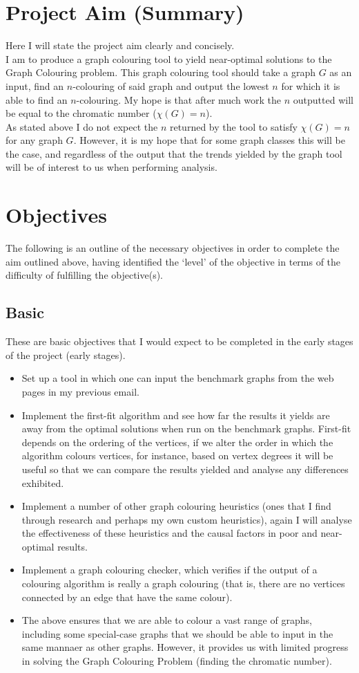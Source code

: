 \documentclass[12pt, a4paper]{article}
\begin{document}
\section*{Project Aim (Summary)}
Here I will state the project aim clearly and concisely.\\
I am to produce a graph colouring tool to yield near-optimal solutions to the Graph Colouring problem. This graph colouring tool should take a graph $G$ as an input, find an $n$-colouring of said graph and output the lowest $n$ for which it is able to find an $n$-colouring. My hope is that after much work the $n$ outputted will be equal to the chromatic number ($\chi(G) = n$).\\
As stated above I do not expect the $n$ returned by the tool to satisfy $\chi(G) = n$ for any graph $G$. However, it is my hope that for some graph classes this will be the case, and regardless of the output that the trends yielded by the graph tool will be of interest to us when performing analysis.
\section*{Objectives}
The following is an outline of the necessary objectives in order to complete the aim outlined above, having identified the `level' of the objective in terms of the difficulty of fulfilling the objective(s).
\subsection*{Basic}
These are basic objectives that I would expect to be completed in the early stages of the project (early stages).
\begin{itemize}
\renewcommand\labelitemi{\tiny$\bullet$}
\item Set up a tool in which one can input the benchmark graphs from the web pages in my previous email.
\item Implement the first-fit algorithm and see how far the results it yields are away from the optimal solutions when run on the benchmark graphs. First-fit depends on the ordering of the vertices, if we alter the order in which the algorithm colours vertices, for instance, based on vertex degrees it will be useful so that we can compare the results yielded and analyse any differences exhibited.
\item Implement a number of other graph colouring heuristics (ones that I find through research and perhaps my own custom heuristics), again I will analyse the effectiveness of these heuristics and the causal factors in poor and near-optimal results.
\item Implement a graph colouring checker, which verifies if the output of a colouring algorithm is really a graph colouring (that is, there are no vertices connected by an edge that have the same colour).
\item The above ensures that we are able to colour a vast range of graphs, including some special-case graphs that we should be able to input in the same mannaer as other graphs. However, it provides us with limited progress in solving the Graph Colouring Problem (finding the chromatic number). 
\end{itemize}    
\end{document}
